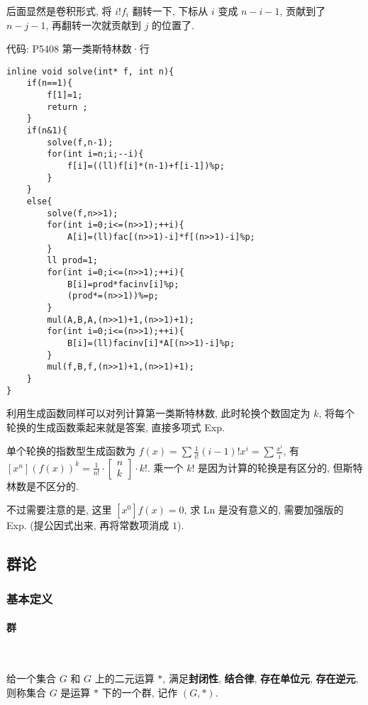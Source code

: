 \documentclass{ctexart}
\begin{document}
后面显然是卷积形式, 将 $i!f_i$ 翻转一下, 下标从 $i$ 变成 $n-i-1$, 贡献到了 $n-j-1$, 再翻转一次就贡献到 $j$ 的位置了.

代码: P5408 第一类斯特林数·行
\begin{lstlisting}
inline void solve(int* f, int n){
    if(n==1){
        f[1]=1;
        return ;
    }
    if(n&1){
        solve(f,n-1);
        for(int i=n;i;--i){
            f[i]=((ll)f[i]*(n-1)+f[i-1])%p;
        }
    }
    else{
        solve(f,n>>1);
        for(int i=0;i<=(n>>1);++i){
            A[i]=(ll)fac[(n>>1)-i]*f[(n>>1)-i]%p;
        }
        ll prod=1;
        for(int i=0;i<=(n>>1);++i){
            B[i]=prod*facinv[i]%p;
            (prod*=(n>>1))%=p;
        }
        mul(A,B,A,(n>>1)+1,(n>>1)+1);
        for(int i=0;i<=(n>>1);++i){
            B[i]=(ll)facinv[i]*A[(n>>1)-i]%p;
        }
        mul(f,B,f,(n>>1)+1,(n>>1)+1);
    }
}
\end{lstlisting}

利用生成函数同样可以对列计算第一类斯特林数, 此时轮换个数固定为 $k$, 将每个轮换的生成函数乘起来就是答案, 直接多项式 Exp.

单个轮换的指数型生成函数为 $f(x)=\sum \frac{1}{i!} (i-1)!x^i = \sum \frac{x^i}{i}$, 
有 $[x^n](f(x))^k= \frac{1}{n!} \cdot \begin{bmatrix} n\\ k \end{bmatrix} \cdot k!$. 
乘一个 $k!$ 是因为计算的轮换是有区分的, 但斯特林数是不区分的.

不过需要注意的是, 这里 $[x^0]f(x)=0$, 求 Ln 是没有意义的, 需要加强版的 Exp. (提公因式出来, 再将常数项消成 $1$).
\subsection{群论}

\subsubsection{基本定义}
\paragraph{群}\ 

给一个集合 $G$ 和 $G$ 上的二元运算 $*$, 满足\textbf{封闭性}, \textbf{结合律}, \textbf{存在单位元}, \textbf{存在逆元}, 则称集合 $G$ 是运算 $*$ 下的一个群, 记作 $(G, *)$.
\end{document}
